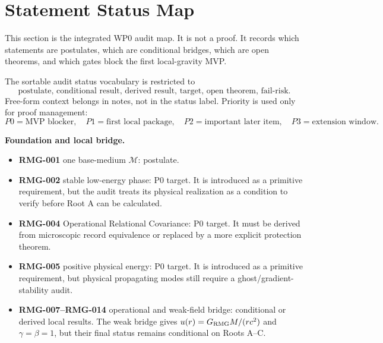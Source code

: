 \documentclass[11pt]{article}
\begin{document}
\section{Statement Status Map}

This section is the integrated WP0 audit map.  It is not a proof.  It records
which statements are postulates, which are conditional bridges, which are open
theorems, and which gates block the first local-gravity MVP.

The sortable audit status vocabulary is restricted to
\[
\boxed{
\text{postulate, conditional result, derived result, target, open theorem, fail-risk}.
}
\]
Free-form context belongs in notes, not in the status label.  Priority is used
only for proof management:
\[
\boxed{
P0=\text{MVP blocker},\quad
P1=\text{first local package},\quad
P2=\text{important later item},\quad
P3=\text{extension window}.
}
\]

\medskip\noindent\textbf{Foundation and local bridge.}
\begin{itemize}
\item \textbf{RMG-001} one base-medium \(\mathcal M\): postulate.
\item \textbf{RMG-002} stable low-energy phase: P0 target.  It is introduced
as a primitive requirement, but the audit treats its physical realization as a
condition to verify before Root A can be calculated.
\item \textbf{RMG-004} Operational Relational Covariance: P0 target.  It must
be derived from microscopic record equivalence or replaced by a more explicit
protection theorem.
\item \textbf{RMG-005} positive physical energy: P0 target.  It is introduced
as a primitive requirement, but physical propagating modes still require a
ghost/gradient-stability audit.
\item \textbf{RMG-007--RMG-014} operational and weak-field bridge: conditional
or derived local results.  The weak bridge gives \(u(r)=G_{\rm RMG}M/(rc^2)\)
and \(\gamma=\beta=1\), but their final status remains conditional on Roots
A--C.
\end{itemize}
\end{document}
